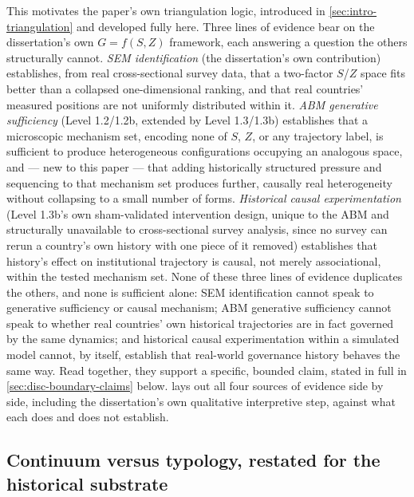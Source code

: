 This motivates the paper's own triangulation logic, introduced in
\cref{sec:intro-triangulation} and developed fully here. Three lines of
evidence bear on the dissertation's own $G=f(S,Z)$ framework, each
answering a question the others structurally cannot. \textit{SEM
identification} (the dissertation's own contribution) establishes, from
real cross-sectional survey data, that a two-factor $S$/$Z$ space fits
better than a collapsed one-dimensional ranking, and that real countries'
measured positions are not uniformly distributed within it. \textit{ABM
generative sufficiency} (Level 1.2/1.2b, extended by Level 1.3/1.3b)
establishes that a microscopic mechanism set, encoding none of $S$, $Z$, or
any trajectory label, is sufficient to produce heterogeneous configurations
occupying an analogous space, and --- new to this paper --- that adding
historically structured pressure and sequencing to that mechanism set
produces further, causally real heterogeneity without collapsing to a
small number of forms. \textit{Historical causal experimentation} (Level
1.3b's own sham-validated intervention design, unique to the ABM and
structurally unavailable to cross-sectional survey analysis, since no
survey can rerun a country's own history with one piece of it removed)
establishes that history's effect on institutional trajectory is causal,
not merely associational, within the tested mechanism set. None of these
three lines of evidence duplicates the others, and none is sufficient
alone: SEM identification cannot speak to generative sufficiency or
causal mechanism; ABM generative sufficiency cannot speak to whether real
countries' own historical trajectories are in fact governed by the same
dynamics; and historical causal experimentation within a simulated model
cannot, by itself, establish that real-world governance history behaves
the same way. Read together, they support a specific, bounded claim,
stated in full in \cref{sec:disc-boundary-claims} below. 
lays out all four sources of evidence side by side, including the
dissertation's own qualitative interpretive step, against what each does
and does not establish.

\begin{table}[htbp]
\centering
\caption{Methodological triangulation: what each line of evidence
establishes, its design, and its own limits.}
\label{tab:method-triangulation}
\end{table}

\subsection{Continuum versus typology, restated for the historical substrate}
\label{sec:disc-continuum-vs-typology}

